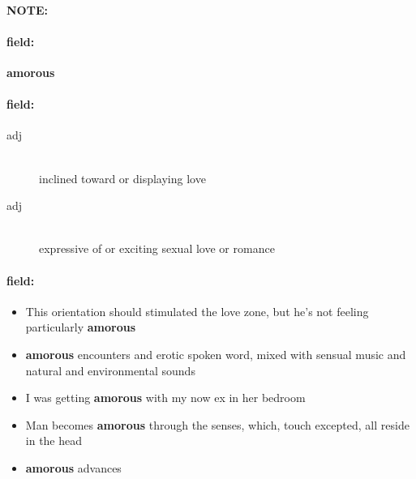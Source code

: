 \documentclass[12pt]{article}
\newenvironment{note}{\paragraph{NOTE:}}{}
\newenvironment{field}{\paragraph{field:}}{}
\begin{document}
\begin{note}
\begin{field}
\textbf{\large amorous}
\end{field}


\begin{field}
\begin{description}
\item[adj] \hfill \\ 
inclined toward or displaying love

\item[adj] \hfill \\ 
expressive of or exciting sexual love or romance

\end{description}
\end{field}

\begin{field}
\begin{itemize}
\item This orientation should stimulated the love zone, but he's not feeling particularly \textbf{amorous}
\item \textbf{amorous} encounters and erotic spoken word, mixed with sensual music and natural and environmental sounds
\item I was getting \textbf{amorous} with my now ex in her bedroom
\item Man becomes \textbf{amorous} through the senses, which, touch excepted, all reside in the head
\item \textbf{amorous} advances
\end{itemize}
\end{field}
\end{note}
\end{document}

